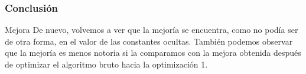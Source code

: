 \begin{frame}[plain]
	\frametitle{Conclusión} 
	
	\begin{exampleblock}{Mejora}
			De nuevo, volvemos a ver que la mejoría se encuentra, como no podía ser de otra forma, en el valor de las constantes ocultas.
			También podemos observar que la mejoría es menos notoria si la comparamos con la mejora obtenida después de optimizar el algoritmo bruto hacia la optimización 1.
		\end{exampleblock}
\end{frame}		


		
		
		
	



